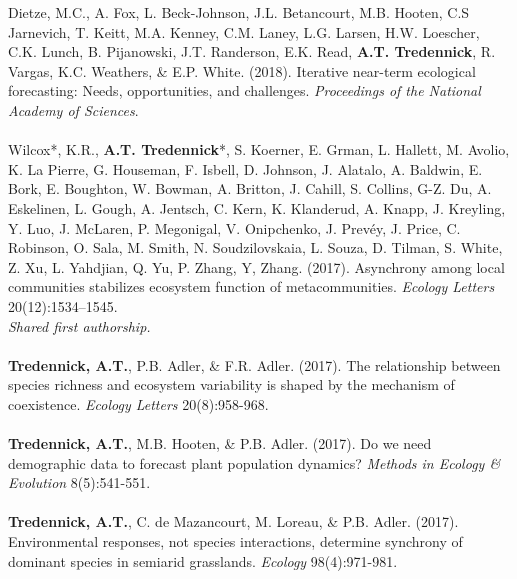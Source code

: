 

\begin{pubentries}
\begin{\small}
Dietze, M.C., A. Fox, L. Beck-Johnson, J.L. Betancourt, M.B. Hooten, C.S Jarnevich, T. Keitt, M.A. Kenney, C.M. Laney, L.G. Larsen, H.W. Loescher, C.K. Lunch, B. Pijanowski, J.T. Randerson, E.K. Read, {\bf{A.T. Tredennick}}, R. Vargas, K.C. Weathers, \& E.P. White. (2018). Iterative near-term ecological forecasting: Needs, opportunities, and challenges. \emph{Proceedings of the National Academy of Sciences}.\\
\\
Wilcox*, K.R., {\bf{A.T. Tredennick}}*, S. Koerner, E. Grman, L. Hallett, M. Avolio, K. La Pierre, G. Houseman, F. Isbell, D. Johnson, J. Alatalo, A. Baldwin, E. Bork, E. Boughton, W. Bowman, A. Britton, J. Cahill, S. Collins, G-Z. Du, A. Eskelinen, L. Gough, A. Jentsch, C. Kern, K. Klanderud, A. Knapp, J. Kreyling, Y. Luo, J. McLaren, P. Megonigal, V. Onipchenko, J. Prevéy, J. Price, C. Robinson, O. Sala, M. Smith, N. Soudzilovskaia, L. Souza, D. Tilman, S. White, Z. Xu, L. Yahdjian, Q. Yu, P. Zhang, Y, Zhang. (2017). Asynchrony among local communities stabilizes ecosystem function of metacommunities. \emph{Ecology Letters} 20(12):1534–1545.\\
{\footnotesize*{\emph{Shared first authorship.}}}\\
\\
{\bf{Tredennick, A.T.}}, P.B. Adler, \& F.R. Adler. (2017). The relationship between species richness and ecosystem variability is shaped by the mechanism of coexistence. \emph{Ecology Letters} 20(8):958-968. \\
\\
{\bf{Tredennick, A.T.}}, M.B. Hooten, \& P.B. Adler. (2017). Do we need demographic data to forecast plant population dynamics? \emph{Methods in Ecology \& Evolution} 8(5):541-551.\\
\\
{\bf{Tredennick, A.T.}}, C. de Mazancourt, M. Loreau, \& P.B. Adler. (2017). Environmental responses, not species interactions, determine synchrony of dominant species in semiarid grasslands. \emph{Ecology} 98(4):971-981.\\

\end{\small}
\end{pubentries}
